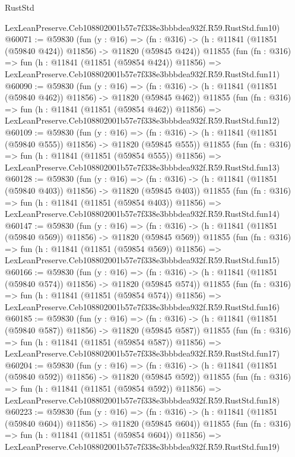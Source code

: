 \begin{lexlean}{RustStd}
\begin{coremodule}
    LexLeanPreserve.Ceb108802001b57e7f338e3bbbdea932f.R59.RustStd.fun10)
@60071 := @59830
    (fun (y : @16) =>
    (fn : @316) -> (h : @11841 (@11851 (@59840 @424)) @11856) -> @11820 (@59845 @424))
    @11855
    (fun (fn : @316) =>
    fun (h : @11841 (@11851 (@59854 @424)) @11856) =>
    LexLeanPreserve.Ceb108802001b57e7f338e3bbbdea932f.R59.RustStd.fun11)
@60090 := @59830
    (fun (y : @16) =>
    (fn : @316) -> (h : @11841 (@11851 (@59840 @462)) @11856) -> @11820 (@59845 @462))
    @11855
    (fun (fn : @316) =>
    fun (h : @11841 (@11851 (@59854 @462)) @11856) =>
    LexLeanPreserve.Ceb108802001b57e7f338e3bbbdea932f.R59.RustStd.fun12)
@60109 := @59830
    (fun (y : @16) =>
    (fn : @316) -> (h : @11841 (@11851 (@59840 @555)) @11856) -> @11820 (@59845 @555))
    @11855
    (fun (fn : @316) =>
    fun (h : @11841 (@11851 (@59854 @555)) @11856) =>
    LexLeanPreserve.Ceb108802001b57e7f338e3bbbdea932f.R59.RustStd.fun13)
@60128 := @59830
    (fun (y : @16) =>
    (fn : @316) -> (h : @11841 (@11851 (@59840 @403)) @11856) -> @11820 (@59845 @403))
    @11855
    (fun (fn : @316) =>
    fun (h : @11841 (@11851 (@59854 @403)) @11856) =>
    LexLeanPreserve.Ceb108802001b57e7f338e3bbbdea932f.R59.RustStd.fun14)
@60147 := @59830
    (fun (y : @16) =>
    (fn : @316) -> (h : @11841 (@11851 (@59840 @569)) @11856) -> @11820 (@59845 @569))
    @11855
    (fun (fn : @316) =>
    fun (h : @11841 (@11851 (@59854 @569)) @11856) =>
    LexLeanPreserve.Ceb108802001b57e7f338e3bbbdea932f.R59.RustStd.fun15)
@60166 := @59830
    (fun (y : @16) =>
    (fn : @316) -> (h : @11841 (@11851 (@59840 @574)) @11856) -> @11820 (@59845 @574))
    @11855
    (fun (fn : @316) =>
    fun (h : @11841 (@11851 (@59854 @574)) @11856) =>
    LexLeanPreserve.Ceb108802001b57e7f338e3bbbdea932f.R59.RustStd.fun16)
@60185 := @59830
    (fun (y : @16) =>
    (fn : @316) -> (h : @11841 (@11851 (@59840 @587)) @11856) -> @11820 (@59845 @587))
    @11855
    (fun (fn : @316) =>
    fun (h : @11841 (@11851 (@59854 @587)) @11856) =>
    LexLeanPreserve.Ceb108802001b57e7f338e3bbbdea932f.R59.RustStd.fun17)
@60204 := @59830
    (fun (y : @16) =>
    (fn : @316) -> (h : @11841 (@11851 (@59840 @592)) @11856) -> @11820 (@59845 @592))
    @11855
    (fun (fn : @316) =>
    fun (h : @11841 (@11851 (@59854 @592)) @11856) =>
    LexLeanPreserve.Ceb108802001b57e7f338e3bbbdea932f.R59.RustStd.fun18)
@60223 := @59830
    (fun (y : @16) =>
    (fn : @316) -> (h : @11841 (@11851 (@59840 @604)) @11856) -> @11820 (@59845 @604))
    @11855
    (fun (fn : @316) =>
    fun (h : @11841 (@11851 (@59854 @604)) @11856) =>
    LexLeanPreserve.Ceb108802001b57e7f338e3bbbdea932f.R59.RustStd.fun19)

\end{coremodule}
\end{lexlean}
